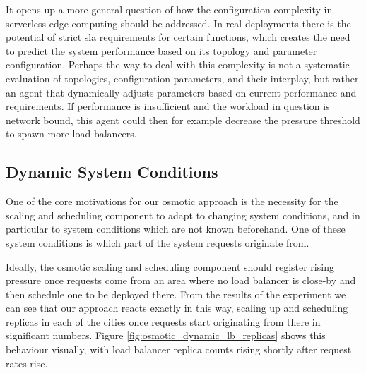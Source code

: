 \documentclass[draft,final]{vutinfth} %
\begin{document}
It opens up a more general question of how the configuration complexity in serverless edge computing should be addressed.
In real deployments there is the potential of strict \gls{sla} requirements for certain functions, which creates the need to predict the system performance based on its topology and parameter configuration.
Perhaps the way to deal with this complexity is not a systematic evaluation of topologies,  configuration parameters, and their interplay, but rather an agent that dynamically adjusts parameters based on current performance and requirements.
If performance is insufficient and the workload in question is network bound, 
this agent could then for example decrease the pressure threshold to spawn more load balancers.




\subsection{Dynamic System Conditions}
One of the core motivations for our osmotic approach is the necessity for the scaling and scheduling component to adapt to changing system conditions, and in particular to system conditions which are not known beforehand.
One of these system conditions is which part of the system requests originate from.

Ideally, the osmotic scaling and scheduling component should register rising pressure once requests come from an area where no load balancer is close-by and then schedule one to be deployed there.
From the results of the experiment we can see that our approach reacts exactly in this way, scaling up and scheduling replicas in each of the cities once requests start originating from there in significant numbers.
Figure \ref{fig:osmotic_dynamic_lb_replicas} shows this behaviour visually, with load balancer replica counts rising shortly after request rates rise.
\end{document}
